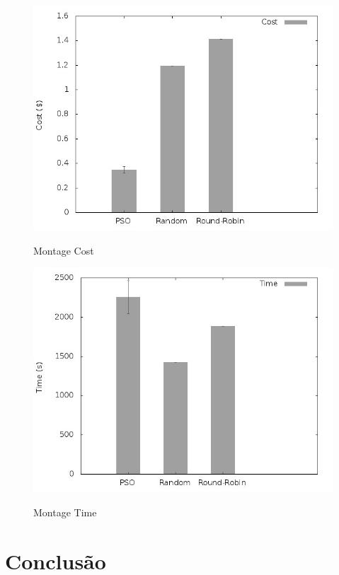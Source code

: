 \documentclass[a4paper,10pt]{article}
\begin{document}
\begin{figure}[!htb]

\centering

\includegraphics[scale=.55]{graphs/papermontage_cost.jpeg}
\label{montage_cost}
\caption{Montage Cost}

\includegraphics[scale=.55]{graphs/papermontage_time.jpeg}
\label{montage_time}
\caption{Montage Time}

\end{figure}

\section{Conclusão}
\end{document}
